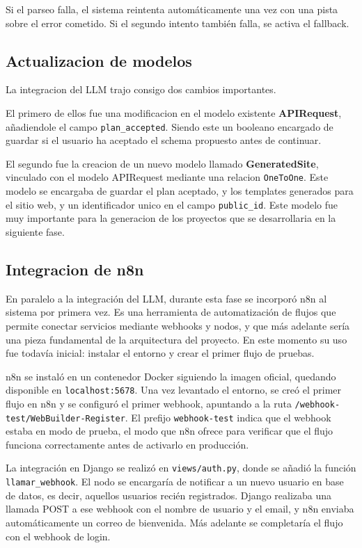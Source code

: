 Si el parseo falla, el sistema reintenta automáticamente una vez con una pista sobre el error cometido. Si el segundo intento también falla, se activa el fallback.


\subsection{Actualizacion de modelos}
\label{subsec:actualizacion-modelos}

La integracion del LLM trajo consigo dos cambios importantes.

El primero de ellos fue una modificacion en el modelo existente \textbf{APIRequest}, añadiendole el campo \texttt{plan\_accepted}. Siendo este un booleano encargado de guardar
si el usuario ha aceptado el schema propuesto antes de continuar.

El segundo fue la creacion de un nuevo modelo llamado \textbf{GeneratedSite}, vinculado con el modelo APIRequest mediante una relacion \texttt{OneToOne}. Este modelo se
encargaba de guardar el plan aceptado, y los templates generados para el sitio web, y un identificador unico en el campo \texttt{public\_id}. Este modelo fue muy importante para
la generacion de los proyectos que se desarrollaria en la siguiente fase.


\subsection{Integracion de n8n}
\label{subsec:integracion-n8n}

En paralelo a la integración del LLM, durante esta fase se incorporó n8n al sistema por primera vez. Es una herramienta de automatización de flujos que permite conectar servicios mediante webhooks y nodos, y que más adelante sería una pieza fundamental de la arquitectura del proyecto. En este momento su uso fue todavía inicial: instalar el entorno y crear el primer flujo de pruebas.

n8n se instaló en un contenedor Docker siguiendo la imagen oficial, quedando disponible en \texttt{localhost:5678}. Una vez levantado el entorno, se creó el primer flujo en n8n y se configuró el primer webhook, apuntando a la ruta \texttt{/webhook-test/WebBuilder-Register}. El prefijo \texttt{webhook-test} indica que el webhook estaba en modo de prueba, el modo que n8n ofrece para verificar que el flujo funciona correctamente antes de activarlo en producción.

La integración en Django se realizó en \texttt{views/auth.py}, donde se añadió la función \texttt{llamar\_webhook}.
El nodo se encargaría de notificar a un nuevo usuario en base de datos, es decir, aquellos usuarios recién registrados. Django realizaba una llamada POST a ese webhook con el nombre de usuario y el email, y n8n enviaba automáticamente un correo de bienvenida. Más adelante se completaría el flujo con el webhook de login.

